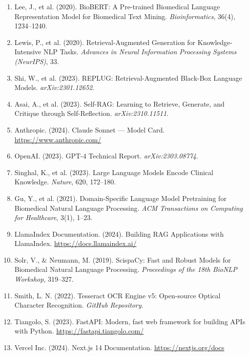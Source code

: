 \documentclass[12pt,a4paper]{report}
\begin{document}
\begin{enumerate}
    \item Lee, J., et al. (2020). BioBERT: A Pre-trained Biomedical Language Representation Model for Biomedical Text Mining. \textit{Bioinformatics}, 36(4), 1234--1240.
    \item Lewis, P., et al. (2020). Retrieval-Augmented Generation for Knowledge-Intensive NLP Tasks. \textit{Advances in Neural Information Processing Systems (NeurIPS)}, 33.
    \item Shi, W., et al. (2023). REPLUG: Retrieval-Augmented Black-Box Language Models. \textit{arXiv:2301.12652}.
    \item Asai, A., et al. (2023). Self-RAG: Learning to Retrieve, Generate, and Critique through Self-Reflection. \textit{arXiv:2310.11511}.
    \item Anthropic. (2024). Claude Sonnet --- Model Card. \url{https://www.anthropic.com/}
    \item OpenAI. (2023). GPT-4 Technical Report. \textit{arXiv:2303.08774}.
    \item Singhal, K., et al. (2023). Large Language Models Encode Clinical Knowledge. \textit{Nature}, 620, 172--180.
    \item Gu, Y., et al. (2021). Domain-Specific Language Model Pretraining for Biomedical Natural Language Processing. \textit{ACM Transactions on Computing for Healthcare}, 3(1), 1--23.
    \item LlamaIndex Documentation. (2024). Building RAG Applications with LlamaIndex. \url{https://docs.llamaindex.ai/}
    \item Solr, V., \& Neumann, M. (2019). ScispaCy: Fast and Robust Models for Biomedical Natural Language Processing. \textit{Proceedings of the 18th BioNLP Workshop}, 319--327.
    \item Smith, L. N. (2022). Tesseract OCR Engine v5: Open-source Optical Character Recognition. \textit{GitHub Repository}.
    \item Tiangolo, S. (2023). FastAPI: Modern, fast web framework for building APIs with Python. \url{https://fastapi.tiangolo.com/}
    \item Vercel Inc. (2024). Next.js 14 Documentation. \url{https://nextjs.org/docs}
\end{enumerate}

\clearpage
\appendix
{}
\end{document}
